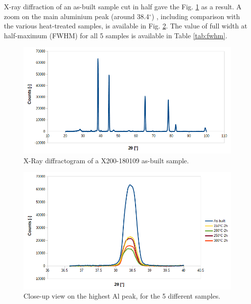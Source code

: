 X-ray diffraction of an as-built sample cut in half gave the Fig. \ref{fig:XRD} as a result. A zoom on the main aluminium peak (around 38.4$^\circ$) \cite{Rosenthal14}, including comparison with the various heat-treated samples, is available in Fig. \ref{fig:XRD_zoom}. The value of full width at half-maximum (FWHM) for all 5 samples is available in Table \ref{tab:fwhm}.

\begin{figure}[ht]
	\centering
	\centerline{\includegraphics[scale=0.60]{Images/XRD}}
	\decoRule
	\caption[X-Ray diffractogram of a X200-180109 as-built sample]{X-Ray diffractogram of a X200-180109 as-built sample.}
	\label{fig:XRD}
\end{figure}

\begin{figure}[ht]
	\centering
	\centerline{\includegraphics[scale=0.60]{Images/XRD_zoom}}
	\decoRule
	\caption[Close-up view on the highest Al peak, for the 5 different samples]{Close-up view on the highest Al peak, for the 5 different samples.}
	\label{fig:XRD_zoom}
\end{figure}


